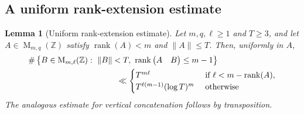 \documentclass[reqno,11pt]{amsart}
\numberwithin{equation}{section}
\newtheorem{lemma}[theorem]{Lemma}
\theoremstyle{definition}
\theoremstyle{remark}
\newcommand{\op}{\operatorname}
\newcommand{\rank}{\op{rank}}
\newcommand{\M}{\op{M}}
\begin{document}
\subsection{A uniform rank-extension estimate}
\begin{lemma}[Uniform rank-extension estimate]
\label{lem:rank-extension} Let $m,q,\ell\ge1$ and $T\ge3$, and let
$A\in\M_{m,q}(\mathbb Z)$ satisfy
$\rank(A)<m$ and $\|A\|\le T$.
Then, uniformly in $A$,
$$
\begin{aligned}
\#&\left\{
B\in\M_{m,\ell}(\mathbb Z):\ \|B\|< T,\
\rank\begin{pmatrix}A&B\end{pmatrix}\le m-1
\right\}
\\&\hspace{35mm}
\ll
\begin{cases}
T^{m\ell}& \text{ if } \ell<m-\rank(A),\\ 
T^{\ell(m-1)}(\log T)^m& \text{ otherwise}
\end{cases}
\end{aligned}
$$
The analogous estimate for vertical concatenation follows by transposition.
\end{lemma}
\end{document}

